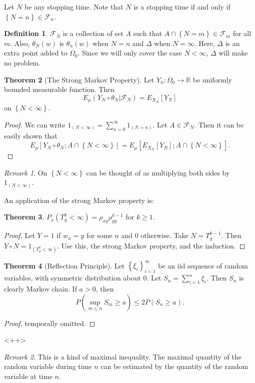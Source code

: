\documentclass{memoir}
\theoremstyle{definition}
\newtheorem{definition}{Definition}[section]
\newtheorem{theorem}[definition]{Theorem}
\theoremstyle{remark}
\newtheorem*{remark}{Remark}
\begin{document}
Let $N$ be any stopping time.
Note that $N$ is a stopping time if and only if $\left\{ N= n \right\} \in \mathcal{F}_n$.

\begin{definition}
	$\mathcal{F}_N$ is a collection of set $A$ such that $A \cap \left\{ N=m \right\} \in \mathcal{F}_m$ for all $m$.
	Also, $\theta_N(w)$ is $\theta_n(w)$ when $N=n$ and $\Delta$ when $N=\infty$.
	Here, $\Delta$ is an extra point added to $\Omega_0$.
	Since we will only cover the case $N<\infty$, $\Delta$ will make no problem.
	\label{<+label+>}
\end{definition}

\begin{theorem}[The Strong Markov Property]
	Let $Y_n : \Omega_0 \rightarrow \mathbb{R}$ be uniformly bounded measurable function.
	Then
	\[
		E_\mu \left( Y_N \circ \theta_N \lvert \mathcal{F}_N \right) = E_{X_N}\left[ Y_N \right]
	\]
	on $\left\{ N < \infty \right\}$.
	\label{strongmarkovproperty}
\end{theorem}

\begin{proof}
	We can write $1_{\left( N < \infty \right)} = \sum_{n=0}^\infty 1_{\left( N= n \right)}$.
	Let $A \in \mathcal{F}_N$.
	Then it can be easily shown that
	\[
		E_\mu \left[ Y_N \circ \theta_N ; A \cap \left\{ N < \infty \right\} \right]
		= E_\mu \left[ E_{X_N}\left[ Y_N \right]; A \cap \left\{ N< \infty \right\} \right].
	\]
\end{proof}

\begin{remark}
	On $\left\{ N < \infty \right\}$ can be thought of as multiplying both sides by $1_{\left( N<\infty \right)}$.
	\label{<+label+>}
\end{remark}

	An application of the strong Markov property is:
\begin{theorem}
	$P_x\left( T_y^k < \infty \right) = \rho_{xy} \rho_{yy}^{k-1}$ for $k \ge 1$.
	\label{<+label+>}
\end{theorem}

\begin{proof}
	Let $Y = 1$ if $w_n = y$ for some $n$ and $0$ otherwise.
	Take $N = T_y^{k-1}$.
	Then $Y \circ N = 1_{\left( T_y^k < \infty \right)}.$
	Use this, the strong Markov property, and the induction.
\end{proof}

\begin{theorem}[Reflection Principle]
	Let $\left\{ \xi_i \right\}_{i=1}^\infty$ be an iid sequence of random variables, with symmetric distribution about $0$.
	Let $S_n = \sum_{i=1}^n \xi_i$.
	Then $S_n$ is clearly Markov chain.
	If $a>0$, then
	\[
		P\left( \sup_{m \le n} S_m \ge a \right) \le 2 P\left( S_n \ge a \right).
	\]
	\label{reflectionprinciple}
\end{theorem}

\begin{proof}
	temporally omitted.
\end{proof}<++>

\begin{remark}
	This is a kind of maximal inequality.
	The maximal quantity of the random variable during time $n$ can be estimated by the quantity of the random variable at time $n$.
	\label{<+label+>}
\end{remark}
\end{document}
